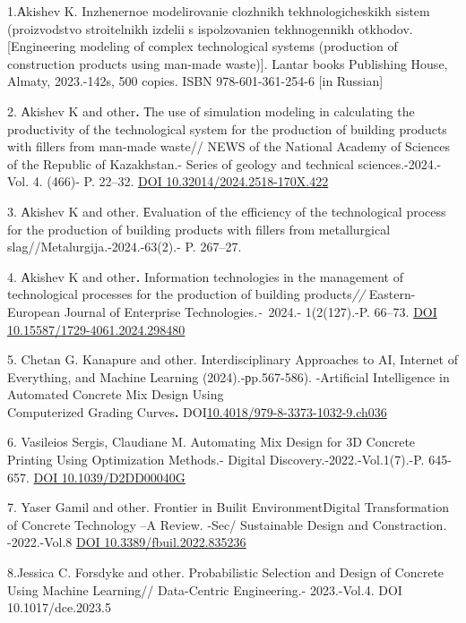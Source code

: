 \begin{references}
1.Аkishev K. Inzhenernoe modelirovanie clozhnikh tekhnologicheskikh
sistem (proizvodstvo stroitelnikh izdelii s ispolzovanien tekhnogennikh
otkhodov. {[}Engineering modeling of complex technological systems
(production of construction products using man-made waste){]}. Lantar
books Publishing House, Almaty, 2023.-142s, 500 copies. ISBN
978-601-361-254-6 {[}in Russian{]}

2. Аkishev K and other{\bfseries .} Тhe use of simulation modeling in
calculating the productivity of the technological system for the
production of building products with fillers from man-made waste// NEWS
of the National Academy of Sciences of the Republic of Kazakhstan.-
Series of geology and technical sciences.-2024.-Vol. 4. (466)- P.
22--32. \href{https://doi.org/10.32014/2024.2518-170X.422}{DOI
10.32014/2024.2518-170X.422}

3. Аkishev K and other. Еvaluation of the efficiency of the
technological process for the production of building products with
fillers from metallurgical slag//Metalurgija.-2024.-63(2).- P. 267--27.

4. Аkishev K and other\emph{{\bfseries .}} Information technologies in the
management of technological processes for the production of building
products\emph{//} Eastern-European Journal of Enterprise
Technologies\emph{.-~}2024.- 1(2(127).-P. 66--73.
\href{https://doi.org/10.15587/1729-4061.2024.298480}{DOI
10.15587/1729-4061.2024.298480}

5. Chetan G. Kanapure and other. Interdisciplinary Approaches to AI,
Internet of Everything, and Machine Learning (2024).-рp.567-586).
-Artificial Intelligence in Automated Concrete Mix Design Using\\
Computerized Grading Curves{\bfseries .}
DOI\href{http://dx.doi.org/10.4018/979-8-3373-1032-9.ch036}{10.4018/979-8-3373-1032-9.ch036}

6. Vasileios Sergis, Claudiane M. Automating Mix Design for 3D Concrete
Printing Using Optimization Methods.- Digital
Discovery.-2022.-Vol.1(7).-P. 645-657.
\href{https://doi.org/10.1039/D2DD00040G}{DOI 10.1039/D2DD00040G}

7. Yaser Gamil and other. Frontier in Builit EnvironmentDigital
Transformation of Concrete Technology --A Review. -Sec/ Sustainable
Design and Constraction. -2022.-Vol.8
\href{https://doi.org/10.3389/fbuil.2022.835236}{DOI
10.3389/fbuil.2022.835236}

8.Jessica C. Forsdyke and other. Probabilistic Selection and Design of
Concrete Using Machine Learning// Data-Centric Engineering.-
2023.-Vol.4. DOI 10.1017/dce.2023.5


\end{references}
